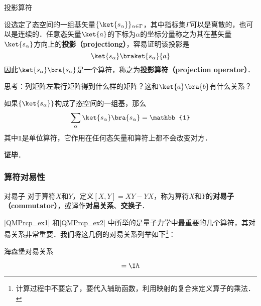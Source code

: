 \begin{example}{投影算符}

设选定了态空间的一组基矢量$\{\ket{s_\alpha}\}_{\alpha\in \Gamma}$，其中指标集$\Gamma$可以是离散的，也可以是连续的．任意态矢量$\ket{a}$的下标为$\alpha$的坐标分量称之为其在基矢量$\ket{s_\alpha}$方向上的\textbf{投影（projectiong）}，容易证明该投影是
\begin{equation}
\ket{s_\alpha}\braket{s_\alpha}{a}
\end{equation}
因此$\ket{s_\alpha}\bra{s_\alpha}$是一个算符，称之为\textbf{投影算符（projection operator）}．

思考：列矩阵左乘行矩阵得到什么样的矩阵？这和$\ket{a}\bra{b}$有什么关系？

\end{example}


如果$\{\ket{s_\alpha}\}$构成了态空间的一组基，那么
\begin{equation}
\sum_\alpha \ket{s_\alpha}\bra{s_\alpha} = \mathbb{1}
\end{equation}
其中$\mathbb{1}$是单位算符，它作用在任何态矢量和算符上都不会改变对方．


\textbf{证毕}．







\subsubsection{算符对易性}



\begin{definition}{对易子}
对于算符$X$和$Y$，定义$[X, Y]=XY-YX$，称为算符$X$和$Y$的\textbf{对易子（commutator）}，或译作\textbf{对易关系}、\textbf{交换子}．
\end{definition}

\autoref{QMPrcp_ex1} 和\autoref{QMPrcp_ex2} 中所举的是量子力学中最重要的几个算符，其对易关系非常重要．我们将这几例的对易关系列举如下\footnote{计算过程中不要忘了，要代入辅助函数，利用映射的复合来定义算子的乘法．}：

\begin{theorem}{海森堡对易关系}\label{QMPrcp_the5}

\begin{equation}
[\hat{x}, \hat{p}_x] = \I\hbar
\end{equation}

\end{theorem}



